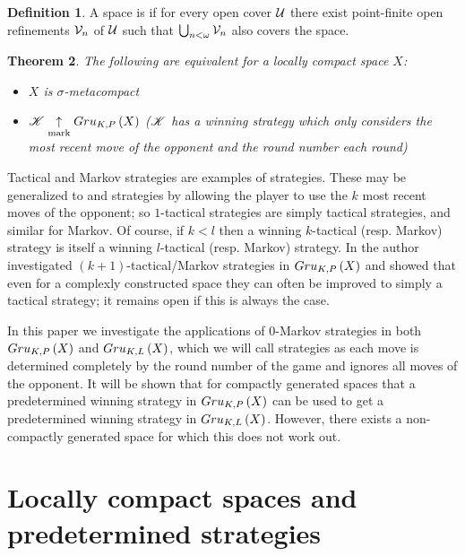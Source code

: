 \documentclass{amsart}
\newtheorem{theorem}{Theorem}[section]
\theoremstyle{definition}
\newtheorem{definition}[theorem]{Definition}
\begin{document}
\begin{definition}
  A space is  if for every open cover $\mathcal{U}$ there
  exist point-finite open refinements $\mathcal{V}_n$ of $\mathcal{U}$ such that
  $\bigcup_{n<\omega}\mathcal{V}_n$ also covers the space.
\end{definition}

\begin{theorem}
  The following are equivalent for a locally compact space $X$:
    \begin{itemize}
      \item $X$ is $\sigma$-metacompact
      \item $\mathscr{K} \underset{\text{mark}}{\uparrow} Gru_{K,P}\left({X}\right)$ (\(\mathscr{K}\) has a 
      winning strategy which only considers the most recent move of
      the opponent and the round number each round)
    \end{itemize}
\end{theorem}

Tactical and Markov strategies are examples of 
strategies. These may be generalized to  and
 strategies by allowing the player to use the \(k\)
most recent moves of the opponent; so \(1\)-tactical strategies are
simply tactical strategies, and similar for Markov. Of course, if
\(k<l\) then a winning \(k\)-tactical (resp. Markov) strategy
is itself a winning \(l\)-tactical (resp. Markov) strategy.
In \cite{QAClontzPreprint}
the author investigated \((k+1)\)-tactical/Markov strategies in \(Gru_{K,P}\left({X}\right)\)
and showed that even for a complexly constructed space they can often be
improved to simply a tactical strategy; it remains open if this is always
the case.

In this paper we investigate the applications of \(0\)-Markov strategies
in both \(Gru_{K,P}\left({X}\right)\) and \(Gru_{K,L}\left({X}\right)\),
which we will call  strategies as each move is determined
completely by the round number of the game and ignores all moves of the
opponent. It will be shown that for compactly generated spaces that a
predetermined winning strategy in \(Gru_{K,P}\left({X}\right)\) can be used to get a
predetermined winning strategy in \(Gru_{K,L}\left({X}\right)\).
However, there exists a non-compactly generated space
for which this does not work out.

\section{Locally compact spaces and predetermined strategies}
\end{document}

